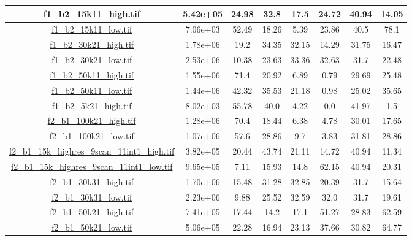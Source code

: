 \begin{table}[h]
\begin{adjustwidth}{-1cm}{}
\begin{tabular}{ |c |c |c |c |c |c |c |c |}
{\hyperlink{histf1_b2_15k11_high}{\color{blue}f1\_b2\_15k11\_high.tif}} & 5.42e+05 & 24.98 & 32.8 & 17.5 & 24.72 & 40.94 & 14.05\\ \hline
{\hyperlink{histf1_b2_15k11_low}{\color{blue}f1\_b2\_15k11\_low.tif}} & 7.06e+03 & 52.49 & 18.26 & 5.39 & 23.86 & 40.5 & 78.1\\ \hline
{\hyperlink{histf1_b2_30k21_high}{\color{blue}f1\_b2\_30k21\_high.tif}} & 1.78e+06 & 19.2 & 34.35 & 32.15 & 14.29 & 31.75 & 16.47\\ \hline
{\hyperlink{histf1_b2_30k21_low}{\color{blue}f1\_b2\_30k21\_low.tif}} & 2.53e+06 & 10.38 & 23.63 & 33.36 & 32.63 & 31.7 & 22.48\\ \hline
{\hyperlink{histf1_b2_50k11_high}{\color{blue}f1\_b2\_50k11\_high.tif}} & 1.55e+06 & 71.4 & 20.92 & 6.89 & 0.79 & 29.69 & 25.48\\ \hline
{\hyperlink{histf1_b2_50k11_low}{\color{blue}f1\_b2\_50k11\_low.tif}} & 1.44e+06 & 42.32 & 35.53 & 21.18 & 0.98 & 25.02 & 35.65\\ \hline
{\hyperlink{histf1_b2_5k21_high}{\color{blue}f1\_b2\_5k21\_high.tif}} & 8.02e+03 & 55.78 & 40.0 & 4.22 & 0.0 & 41.97 & 1.5\\ \hline
{\hyperlink{histf2_b1_100k21_high}{\color{blue}f2\_b1\_100k21\_high.tif}} & 1.28e+06 & 70.4 & 18.44 & 6.38 & 4.78 & 30.01 & 17.65\\ \hline
{\hyperlink{histf2_b1_100k21_low}{\color{blue}f2\_b1\_100k21\_low.tif}} & 1.07e+06 & 57.6 & 28.86 & 9.7 & 3.83 & 31.81 & 28.86\\ \hline
{\hyperlink{histf2_b1_15k_highres_9scan_11int1_high}{\color{blue}f2\_b1\_15k\_highres\_9scan\_11int1\_high.tif}} & 3.82e+05 & 20.44 & 43.74 & 21.11 & 14.72 & 40.94 & 11.34\\ \hline
{\hyperlink{histf2_b1_15k_highres_9scan_11int1_low}{\color{blue}f2\_b1\_15k\_highres\_9scan\_11int1\_low.tif}} & 9.65e+05 & 7.11 & 15.93 & 14.8 & 62.15 & 40.94 & 20.31\\ \hline
{\hyperlink{histf2_b1_30k31_high}{\color{blue}f2\_b1\_30k31\_high.tif}} & 1.70e+06 & 15.48 & 31.28 & 32.85 & 20.39 & 31.7 & 15.64\\ \hline
{\hyperlink{histf2_b1_30k31_low}{\color{blue}f2\_b1\_30k31\_low.tif}} & 2.23e+06 & 9.88 & 25.52 & 32.59 & 32.0 & 31.7 & 19.61\\ \hline
{\hyperlink{histf2_b1_50k21_high}{\color{blue}f2\_b1\_50k21\_high.tif}} & 7.41e+05 & 17.44 & 14.2 & 17.1 & 51.27 & 28.83 & 62.59\\ \hline
{\hyperlink{histf2_b1_50k21_low}{\color{blue}f2\_b1\_50k21\_low.tif}} & 5.06e+05 & 22.28 & 16.94 & 23.13 & 37.66 & 30.82 & 64.77\\ \hline

\end{tabular}
\end{adjustwidth}
\end{table}

